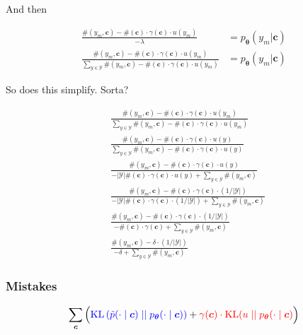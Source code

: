 \documentclass{article}
\newcommand{\KL}{\mathrm{KL}}
\newcommand{\uniform}{u}
\newcommand{\vtheta}{\boldsymbol{\theta}}
\newcommand{\model}{p_{\vtheta}}
\newcommand{\context}{\boldsymbol{c}}
\begin{document}
		And then
		
		\begin{align}
			\frac{\#(y_m, \context) - \#(\context)\cdot \gamma(\context)\cdot u(y_m)}{-\lambda}  &=  \model(y_m|\context) \\
			\frac{\#(y_m, \context) - \#(\context)\cdot \gamma(\context)\cdot u(y_m)}{\sum_{y\in\mathcal{Y}} \#(y_m, \context) - \#(\context)\cdot \gamma(\context)\cdot u(y_m)}  &=  \model(y_m|\context)
		\end{align}
		
		So does this simplify. Sorta?
		
		\begin{align}
			&\frac{\#(y_m, \context) - \#(\context)\cdot \gamma(\context)\cdot u(y_m)}{\sum_{y\in\mathcal{Y}} \#(y_m, \context) - \#(\context)\cdot \gamma(\context)\cdot u(y_m)}  \\
			&\frac{\#(y_m, \context) - \#(\context)\cdot \gamma(\context)\cdot u(y)}{\sum_{y\in\mathcal{Y}} \#(y_m, \context) - \#(\context)\cdot \gamma(\context)\cdot u(y)}  \\
			&\frac{\#(y_m, \context) - \#(\context)\cdot \gamma(\context)\cdot u(y)}{ - |\mathcal{Y}| \#(\context)\cdot \gamma(\context)\cdot u(y) + \sum_{y\in\mathcal{Y}} \#(y_m, \context)} \\
			&\frac{\#(y_m, \context) - \#(\context)\cdot \gamma(\context)\cdot (1/|\mathcal{Y}|)}{ - |\mathcal{Y}| \#(\context)\cdot \gamma(\context)\cdot (1/|\mathcal{Y}|) + \sum_{y\in\mathcal{Y}} \#(y_m, \context)} \\
			&\frac{\#(y_m, \context) - \#(\context)\cdot \gamma(\context)\cdot (1/|\mathcal{Y}|)}{ -  \#(\context)\cdot \gamma(\context) + \sum_{y\in\mathcal{Y}} \#(y_m, \context)} \\
			&\frac{\#(y_m, \context) - \delta\cdot (1/|\mathcal{Y}|)}{ -  \delta + \sum_{y\in\mathcal{Y}} \#(y_m, \context)}
		\end{align}
		
		\subsubsection{Mistakes}
		
			\begin{align}
		  		\sum_{\context} \Big( {\color{blue} \KL\left(\tilde{p}(\cdot 			\mid \context) \mid\mid \model(\cdot \mid \context)					\right)} + {\color{red}\gamma(\context) \cdot 						\KL(\uniform \mid\mid \model(\cdot \mid \context)}\Big)
			\end{align}
			
\end{document}
